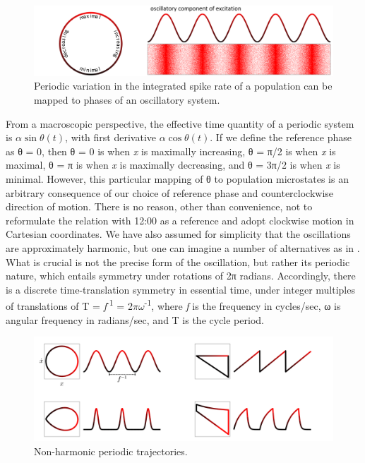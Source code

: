   
\begin{figure}
\includegraphics[width=\textwidth]{figures/Tilsen-img46.png}
\caption{Periodic variation in the integrated spike rate of a population can be mapped to phases of an oscillatory system.}
\label{fig:3:18}
\end{figure}
 

  From a macroscopic perspective, the effective time quantity of a periodic system is {$\alpha \sin{θ(t)}$}, with first derivative {$\alpha \cos{θ(t)}$}. If we define the reference phase as θ = 0, then θ = 0 is when \textit{x} is maximally increasing, θ = π/2 is when \textit{x} is maximal, θ = π is when \textit{x} is maximally decreasing, and θ = 3π/2 is when \textit{x} is minimal. However, this particular mapping of θ to population microstates is an arbitrary consequence of our choice of reference phase and counterclockwise direction of motion. There is no reason, other than convenience, not to reformulate the relation with 12:00 as a reference and adopt clockwise motion in Cartesian coordinates. We have also assumed for simplicity that the oscillations are approximately harmonic, but one can imagine a number of alternatives as in {}. What is crucial is not the precise form of the oscillation, but rather its periodic nature, which entails symmetry under rotations of 2π radians. Accordingly, there is a discrete time-translation symmetry in essential time, under integer multiples of translations of T = \textit{f}\textsuperscript{{}-1} = 2$\pi \omega $\textsuperscript{{}-1}, where \textit{f} is the frequency in cycles/sec, ω is angular frequency in radians/sec, and T is the cycle period.

  
\begin{figure}
\includegraphics[width=\textwidth]{figures/Tilsen-img47.png}
\caption{Non-harmonic periodic trajectories.}
\label{fig:3:19}
\end{figure}
 

